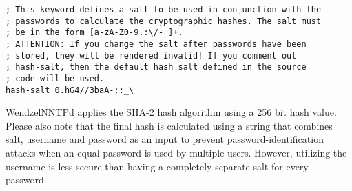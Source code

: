 \begin{verbatim}
; This keyword defines a salt to be used in conjunction with the
; passwords to calculate the cryptographic hashes. The salt must
; be in the form [a-zA-Z0-9.:\/-_]+.
; ATTENTION: If you change the salt after passwords have been
; stored, they will be rendered invalid! If you comment out
; hash-salt, then the default hash salt defined in the source
; code will be used.
hash-salt 0.hG4//3baA-::_\
\end{verbatim}

WendzelNNTPd applies the SHA-2 hash algorithm using a 256 bit hash value. Please also note that the final hash is calculated using a string that combines salt, username and password as an input to prevent password-identification attacks when an equal password is used by multiple users. However, utilizing the username is less secure than having a completely separate salt for every password.


